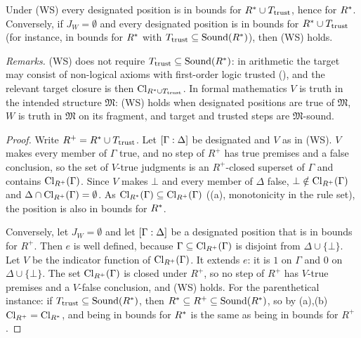 \begin{lemma}\label{lem:setting:WS}
Under (WS) every designated position is in bounds for $R^{*}\cup T_{\mathrm{trust}}$, hence
for $R^{*}$. Conversely, if $J_W=\emptyset$ and every designated position is in
bounds for $R^{*}\cup T_{\mathrm{trust}}$ (for instance, in bounds for $R^{*}$ with
$T_{\mathrm{trust}}\subseteq\mathrm{Sound}(R^{*})$), then (WS) holds.
\end{lemma}

\emph{Remarks.} (WS) does not require $T_{\mathrm{trust}}\subseteq\mathrm{Sound}(R^{*})$: in
arithmetic the target may consist of non-logical axioms with first-order logic
trusted (), and the relevant target closure is then
$\mathrm{Cl}_{R^{*}\cup T_{\mathrm{trust}}}$. In formal mathematics $V$ is truth in the intended
structure $\mathfrak M$: (WS) holds when designated positions are true of
$\mathfrak M$, $W$ is truth in $\mathfrak M$ on its fragment, and target and
trusted steps are $\mathfrak M$-sound.

\begin{proof}
Write $R^+=R^{*}\cup T_{\mathrm{trust}}$. Let $[\Gamma : \Delta]$ be designated and $V$ as
in (WS). $V$ makes every member of $\Gamma$ true, and no step of $R^+$ has true
premises and a false conclusion, so the set of $V$-true judgments is an
$R^+$-closed superset of $\Gamma$ and contains $\mathrm{Cl}_{R^+}(\Gamma)$. Since $V$
makes $\bot$ and every member of $\Delta$ false, $\bot\notin\mathrm{Cl}_{R^+}(\Gamma)$
and $\Delta\cap\mathrm{Cl}_{R^+}(\Gamma)=\emptyset$. As $\mathrm{Cl}_{R^{*}}(\Gamma)\subseteq
\mathrm{Cl}_{R^+}(\Gamma)$ ((a), monotonicity in the rule set),
the position is also in bounds for $R^{*}$.

Conversely, let $J_W=\emptyset$ and let $[\Gamma : \Delta]$ be a designated
position that is in bounds for $R^+$. Then $e$ is well defined, because
$\Gamma\subseteq\mathrm{Cl}_{R^+}(\Gamma)$ is disjoint from $\Delta\cup\{\bot\}$. Let $V$
be the indicator function of $\mathrm{Cl}_{R^+}(\Gamma)$. It extends $e$: it is $1$ on
$\Gamma$ and $0$ on $\Delta\cup\{\bot\}$. The set $\mathrm{Cl}_{R^+}(\Gamma)$ is closed
under $R^+$, so no step of $R^+$ has $V$-true premises and a $V$-false conclusion,
and (WS) holds. For the parenthetical instance: if $T_{\mathrm{trust}}\subseteq\mathrm{Sound}(R^{*})$,
then $R^{*}\subseteq R^+\subseteq\mathrm{Sound}(R^{*})$, so by
(a),(b) $\mathrm{Cl}_{R^+}=\mathrm{Cl}_{R^{*}}$, and being in bounds
for $R^{*}$ is the same as being in bounds for $R^+$.
\end{proof}
